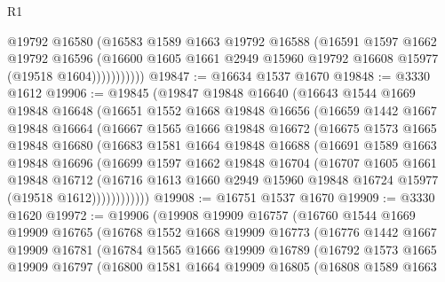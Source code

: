 \begin{lexlean}{R1}
\begin{coremodule}
                  @19792
                  @16580
                  (@16583
                    @1589
                    @1663
                    @19792
                    @16588
                    (@16591
                      @1597
                      @1662
                      @19792
                      @16596
                      (@16600 @1605 @1661 @2949 @15960 @19792 @16608 @15977 (@19518 @1604)))))))))))
@19847 := @16634 @1537 @1670
@19848 := @3330 @1612
@19906 := @19845
    (@19847
      @19848
      @16640
      (@16643
        @1544
        @1669
        @19848
        @16648
        (@16651
          @1552
          @1668
          @19848
          @16656
          (@16659
            @1442
            @1667
            @19848
            @16664
            (@16667
              @1565
              @1666
              @19848
              @16672
              (@16675
                @1573
                @1665
                @19848
                @16680
                (@16683
                  @1581
                  @1664
                  @19848
                  @16688
                  (@16691
                    @1589
                    @1663
                    @19848
                    @16696
                    (@16699
                      @1597
                      @1662
                      @19848
                      @16704
                      (@16707
                        @1605
                        @1661
                        @19848
                        @16712
                        (@16716
                          @1613
                          @1660
                          @2949
                          @15960
                          @19848
                          @16724
                          @15977
                          (@19518 @1612))))))))))))
@19908 := @16751 @1537 @1670
@19909 := @3330 @1620
@19972 := @19906
    (@19908
      @19909
      @16757
      (@16760
        @1544
        @1669
        @19909
        @16765
        (@16768
          @1552
          @1668
          @19909
          @16773
          (@16776
            @1442
            @1667
            @19909
            @16781
            (@16784
              @1565
              @1666
              @19909
              @16789
              (@16792
                @1573
                @1665
                @19909
                @16797
                (@16800
                  @1581
                  @1664
                  @19909
                  @16805
                  (@16808
                    @1589
                    @1663

\end{coremodule}
\end{lexlean}
